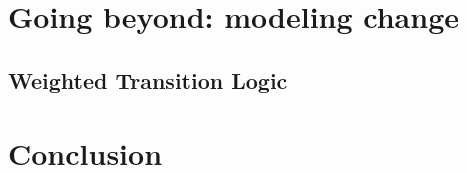 \documentclass[11pt,a4paper,twoside]{book}
\newcommand\blankpage{%
    \null
    \thispagestyle{empty}%
    \addtocounter{page}{-1}%
    \newpage}
\begin{document}
\chapter{Going beyond: modeling change}
\section{Weighted Transition Logic}


\chapter{Conclusion}\label{concl}\label{conclusion}



% 
% 
%     



\begin{appendices}
%    

\end{appendices}


\backmatter

    
\end{document}
